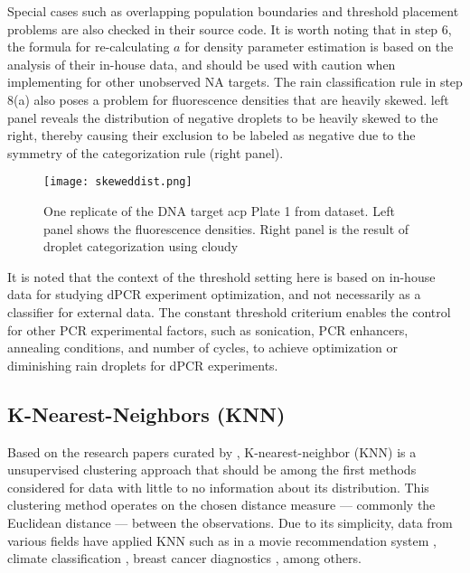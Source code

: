 Special cases such as overlapping population boundaries and threshold placement problems are also checked in their source code. It is worth noting that in step 6, the formula for re-calculating \(a\) for density parameter estimation is based on the analysis of their in-house data, and should be used with caution when implementing for other unobserved NA targets. The rain classification rule in step 8(a) also poses a problem for fluorescence densities that are heavily skewed.  left panel reveals the distribution of negative droplets to be heavily skewed to the right, thereby causing their exclusion to be labeled as negative due to the symmetry of the categorization rule (right panel).

\begin{figure}[h]
    \centering
    \texttt{[image: skeweddist.png]}
    \caption[Fluorescence distribution of DNA target acp]{One replicate of the DNA target acp Plate 1 from  dataset. Left panel shows the fluorescence densities. Right panel is the result of droplet categorization using cloudy}
        \label{fig:skeweddist}
\end{figure}

It is noted that the context of the threshold setting here is based on in-house data for studying dPCR experiment optimization, and not necessarily as a classifier for external data. The constant threshold criterium enables the control for other PCR experimental factors, such as sonication, PCR enhancers, annealing conditions, and number of cycles, to achieve optimization or diminishing rain droplets for dPCR experiments.

\subsection{K-Nearest-Neighbors (KNN)}
\label{sec:knn}
Based on the research papers curated by , K-nearest-neighbor (KNN) is a unsupervised clustering approach that should be among the first methods considered for data with little to no information about its distribution. This clustering method operates on the chosen distance measure — commonly the Euclidean distance — between the observations. Due to its simplicity, data from various fields have applied KNN such as in a movie recommendation system \cite{Ahuja2019}, climate classification \cite{Shi2020}, breast cancer diagnostics \cite{Mittal2019}, among others.

